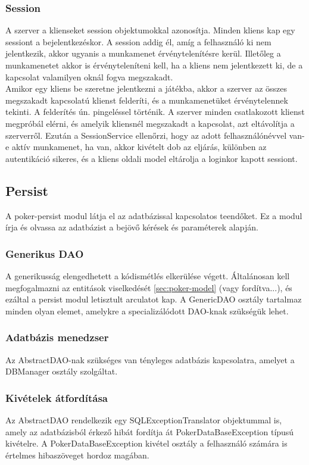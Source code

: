 \subsubsection{Session}
A szerver a klienseket session objektumokkal azonosítja. Minden kliens kap egy sessiont a bejelentkezéskor. A session addig él, amíg a felhasználó ki nem jelentkezik, akkor ugyanis a munkamenet érvénytelenítésre kerül. Illetőleg a munkamenetet akkor is érvényteleníteni kell, ha a kliens nem jelentkezett ki, de a kapcsolat valamilyen oknál fogva megszakadt. \\
Amikor egy kliens be szeretne jelentkezni a játékba, akkor a szerver az összes megszakadt kapcsolatú klienst felderíti, és a munkamenetüket érvénytelennek tekinti. A felderítés ún. pingeléssel történik. A szerver minden csatlakozott klienst megpróbál elérni, és amelyik kliensnél megszakadt a kapcsolat, azt eltávolítja a szerverről. Ezután a SessionService ellenőrzi, hogy az adott felhasználónévvel van-e aktív munkamenet, ha van, akkor kivételt dob az eljárás, különben az autentikáció sikeres, és a kliens oldali model eltárolja a loginkor kapott sessiont.

\subsection{Persist}
A poker-persist modul látja el az adatbázissal kapcsolatos teendőket. Ez a modul írja és olvassa az adatbázist a bejövő kérések és paraméterek alapján.

\subsubsection{Generikus DAO}
A generikusság elengedhetett a kódismétlés elkerülése végett. Általánosan kell megfogalmazni az entitások viselkedését \ref{sec:poker-model} (vagy fordítva...), és ezáltal a persist modul letisztult arculatot kap. A GenericDAO osztály tartalmaz minden olyan elemet, amelykre a specializálódott DAO-knak szükségük lehet.

\subsubsection{Adatbázis menedzser}
Az AbstractDAO-nak szükséges van tényleges adatbázis kapcsolatra, amelyet a DBManager osztály szolgáltat.

\subsubsection{Kivételek átfordítása}
Az AbstractDAO rendelkezik egy SQLExceptionTranslator objektummal is, amely az adatbázisból érkező hibát fordítja át PokerDataBaseException típusú kivételre. A PokerDataBaseException kivétel osztály a felhasználó számára is értelmes hibaszöveget hordoz magában.

